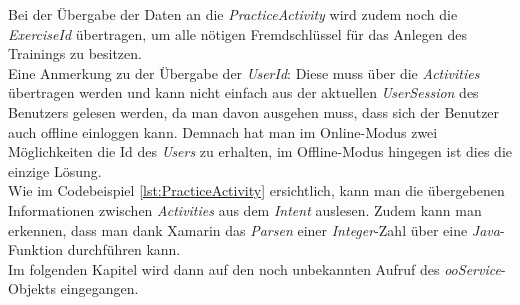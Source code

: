 
Bei der Übergabe der Daten an die \textit{PracticeActivity} wird zudem noch die \textit{ExerciseId} übertragen, um alle nötigen Fremdschlüssel für das Anlegen des Trainings zu besitzen.\\
Eine Anmerkung zu der Übergabe der \textit{UserId}: Diese muss über die \textit{Activities} übertragen werden und kann nicht einfach aus der aktuellen \textit{UserSession} des Benutzers gelesen werden, da man davon ausgehen muss, dass sich der Benutzer auch offline einloggen kann. Demnach hat man im Online-Modus zwei Möglichkeiten die Id des \textit{Users} zu erhalten, im Offline-Modus hingegen ist dies die einzige Lösung.\\

Wie im Codebeispiel \ref{lst:PracticeActivity} ersichtlich, kann man die übergebenen Informationen zwischen \textit{Activities} aus dem \textit{Intent} auslesen. Zudem kann man erkennen, dass man dank Xamarin das \textit{Parsen} einer \textit{Integer}-Zahl über eine \textit{Java}-Funktion durchführen kann.\\
Im folgenden Kapitel wird dann auf den noch unbekannten Aufruf des \textit{ooService}-Objekts eingegangen.
